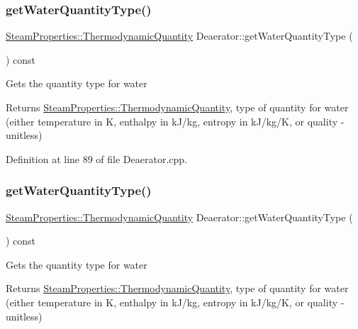 \subsubsection{\texorpdfstring{get\+Water\+Quantity\+Type()}{getWaterQuantityType()}\hspace{0.1cm}{\footnotesize\ttfamily [2/3]}}
{\footnotesize\ttfamily \hyperlink{class_steam_properties_ae0294bedf7d178c2d8fb6aed0f62fbff}{Steam\+Properties\+::\+Thermodynamic\+Quantity} Deaerator\+::get\+Water\+Quantity\+Type (\begin{DoxyParamCaption}{ }\end{DoxyParamCaption}) const}

Gets the quantity type for water \begin{DoxyReturn}{Returns}
\hyperlink{class_steam_properties_ae0294bedf7d178c2d8fb6aed0f62fbff}{Steam\+Properties\+::\+Thermodynamic\+Quantity}, type of quantity for water (either temperature in K, enthalpy in k\+J/kg, entropy in k\+J/kg/K, or quality -\/ unitless) 
\end{DoxyReturn}


Definition at line 89 of file Deaerator.\+cpp.

\mbox{\label{class_deaerator_a414282f81906e09a28bc75cf51659ec2}} 
\subsubsection{\texorpdfstring{get\+Water\+Quantity\+Type()}{getWaterQuantityType()}\hspace{0.1cm}{\footnotesize\ttfamily [3/3]}}
{\footnotesize\ttfamily \hyperlink{class_steam_properties_ae0294bedf7d178c2d8fb6aed0f62fbff}{Steam\+Properties\+::\+Thermodynamic\+Quantity} Deaerator\+::get\+Water\+Quantity\+Type (\begin{DoxyParamCaption}{ }\end{DoxyParamCaption}) const}

Gets the quantity type for water \begin{DoxyReturn}{Returns}
\hyperlink{class_steam_properties_ae0294bedf7d178c2d8fb6aed0f62fbff}{Steam\+Properties\+::\+Thermodynamic\+Quantity}, type of quantity for water (either temperature in K, enthalpy in k\+J/kg, entropy in k\+J/kg/K, or quality -\/ unitless) 
\end{DoxyReturn}
\mbox{\label{class_deaerator_a9362430fb04802b6f14c9bf09d62a466}} 

